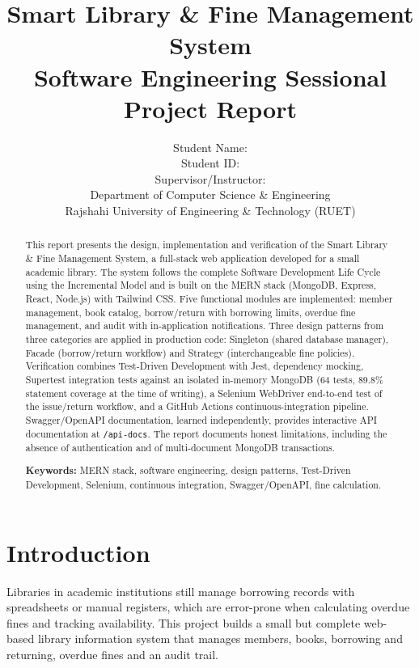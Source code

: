 \documentclass[12pt,a4paper]{article}
\title{\textbf{Smart Library \& Fine Management System}\\[0.5em]
\large Software Engineering Sessional Project Report}
\author{%
  Student Name: \placeholder{your name}\\
  Student ID: \placeholder{your ID}\\
  Supervisor/Instructor: \placeholder{instructor name}\\
  Department of Computer Science \& Engineering\\
  Rajshahi University of Engineering \& Technology (RUET)
}
\date{\placeholder{submission date}}
\begin{document}
\maketitle
\thispagestyle{empty}

\begin{abstract}
This report presents the design, implementation and verification of the
Smart Library \& Fine Management System, a full-stack web application
developed for a small academic library. The system follows the complete
Software Development Life Cycle using the Incremental Model and is built on
the MERN stack (MongoDB, Express, React, Node.js) with Tailwind CSS. Five
functional modules are implemented: member management, book catalog,
borrow/return with borrowing limits, overdue fine management, and audit with
in-application notifications. Three design patterns from three categories are
applied in production code: Singleton (shared database manager), Facade
(borrow/return workflow) and Strategy (interchangeable fine policies).
Verification combines Test-Driven Development with Jest, dependency mocking,
Supertest integration tests against an isolated in-memory MongoDB
(64 tests, 89.8\% statement coverage at the time of writing), a Selenium
WebDriver end-to-end test of the issue/return workflow, and a GitHub Actions
continuous-integration pipeline. Swagger/OpenAPI documentation, learned
independently, provides interactive API documentation at \texttt{/api-docs}.
The report documents honest limitations, including the absence of
authentication and of multi-document MongoDB transactions.

\vspace{1em}
\noindent\textbf{Keywords:} MERN stack, software engineering, design
patterns, Test-Driven Development, Selenium, continuous integration,
Swagger/OpenAPI, fine calculation.
\end{abstract}

\tableofcontents
\listoffigures
\newpage

\section{Introduction}
Libraries in academic institutions still manage borrowing records with
spreadsheets or manual registers, which are error-prone when calculating
overdue fines and tracking availability. This project builds a small but
complete web-based library information system that manages members, books,
borrowing and returning, overdue fines and an audit trail.
\end{document}
